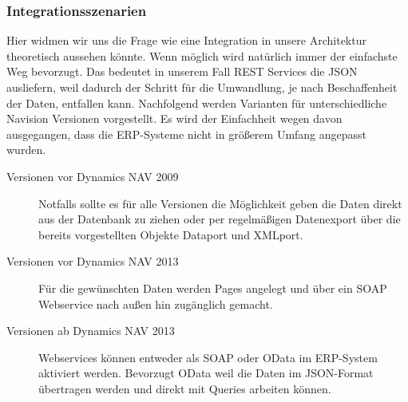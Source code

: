 \subsubsection*{Integrationsszenarien}
Hier widmen wir uns die Frage wie eine Integration in unsere Architektur theoretisch aussehen könnte. Wenn möglich wird natürlich immer der einfachste Weg bevorzugt. Das bedeutet in unserem Fall REST Services die JSON ausliefern, weil dadurch der Schritt für die Umwandlung, je nach Beschaffenheit der Daten, entfallen kann.
Nachfolgend werden Varianten für unterschiedliche Navision Versionen vorgestellt. Es wird der Einfachheit wegen davon ausgegangen, dass die ERP-Systeme nicht in größerem Umfang angepasst wurden.

\begin{description}
\item [Versionen vor Dynamics NAV 2009] Notfalls sollte es für alle Versionen die Möglichkeit geben die Daten direkt aus der Datenbank zu ziehen oder per regelmäßigen Datenexport über die bereits vorgestellten Objekte Dataport und XMLport.
\item [Versionen vor Dynamics NAV 2013] Für die gewünschten Daten werden Pages angelegt und über ein SOAP Webservice nach außen hin zugänglich gemacht.
\item [Versionen ab Dynamics NAV 2013] Webservices können entweder als SOAP oder OData im ERP-System aktiviert werden. Bevorzugt OData weil die Daten im JSON-Format übertragen werden und direkt mit Queries arbeiten können.
\end{description}